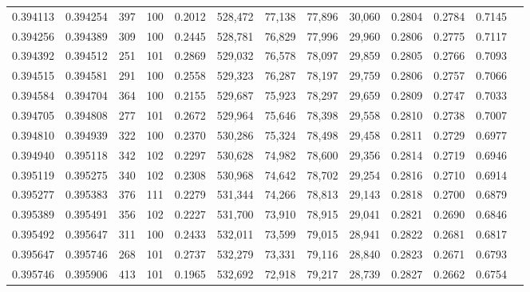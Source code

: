 \begin{tabular}{rrrrrrrrrrrrr}
0.394113 & 0.394254 &   397 & 100 &                                     0.2012 & 528,472 &  77,138 &  77,896 &  30,060 & 0.2804 & 0.2784 & 0.7145 \\
0.394256 & 0.394389 &   309 & 100 &                                     0.2445 & 528,781 &  76,829 &  77,996 &  29,960 & 0.2806 & 0.2775 & 0.7117 \\
0.394392 & 0.394512 &   251 & 101 &                                     0.2869 & 529,032 &  76,578 &  78,097 &  29,859 & 0.2805 & 0.2766 & 0.7093 \\
0.394515 & 0.394581 &   291 & 100 &                                     0.2558 & 529,323 &  76,287 &  78,197 &  29,759 & 0.2806 & 0.2757 & 0.7066 \\
0.394584 & 0.394704 &   364 & 100 &                                     0.2155 & 529,687 &  75,923 &  78,297 &  29,659 & 0.2809 & 0.2747 & 0.7033 \\
0.394705 & 0.394808 &   277 & 101 &                                     0.2672 & 529,964 &  75,646 &  78,398 &  29,558 & 0.2810 & 0.2738 & 0.7007 \\
0.394810 & 0.394939 &   322 & 100 &                                     0.2370 & 530,286 &  75,324 &  78,498 &  29,458 & 0.2811 & 0.2729 & 0.6977 \\
0.394940 & 0.395118 &   342 & 102 &                                     0.2297 & 530,628 &  74,982 &  78,600 &  29,356 & 0.2814 & 0.2719 & 0.6946 \\
0.395119 & 0.395275 &   340 & 102 &                                     0.2308 & 530,968 &  74,642 &  78,702 &  29,254 & 0.2816 & 0.2710 & 0.6914 \\
0.395277 & 0.395383 &   376 & 111 &                                     0.2279 & 531,344 &  74,266 &  78,813 &  29,143 & 0.2818 & 0.2700 & 0.6879 \\
0.395389 & 0.395491 &   356 & 102 &                                     0.2227 & 531,700 &  73,910 &  78,915 &  29,041 & 0.2821 & 0.2690 & 0.6846 \\
0.395492 & 0.395647 &   311 & 100 &                                     0.2433 & 532,011 &  73,599 &  79,015 &  28,941 & 0.2822 & 0.2681 & 0.6817 \\
0.395647 & 0.395746 &   268 & 101 &                                     0.2737 & 532,279 &  73,331 &  79,116 &  28,840 & 0.2823 & 0.2671 & 0.6793 \\
0.395746 & 0.395906 &   413 & 101 &                                     0.1965 & 532,692 &  72,918 &  79,217 &  28,739 & 0.2827 & 0.2662 & 0.6754 \\

\end{tabular}
